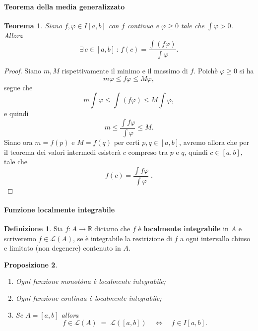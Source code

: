 \documentclass{article}
\theoremstyle{plain}
\newtheorem{thm}{Teorema}[section]
\newtheorem{prop}[thm]{Proposizione}
\theoremstyle{definition}
\newtheorem{defn}{Definizione}[section]
\theoremstyle{remark}
\begin{document}
\paragraph{Teorema della media generalizzato}
\begin{bxthm}
\begin{thm}
    Siano $f,\varphi\in I[a,b]$ con $f$ continua e $\varphi\geq0$ tale che $\int\varphi>0$. 
    Allora 
    \[\exists\,c\in[a,b]\,:\,f(c)=\dfrac{\int (f\varphi)}{\int\varphi}.\]
\end{thm}
\end{bxthm}
\begin{proof}
    Siano $m,M$ rispettivamente il minimo e il massimo di $f$. 
    Poichè $\varphi\geq0$ si ha \[m\varphi\leq f\varphi\leq M\varphi,\] 
    segue che 
    \[m\int\varphi\leq\int(f\varphi)\leq M\int\varphi,\]
    e quindi
    \[m\leq\dfrac{\int f\varphi}{\int\varphi}\leq M.\]
    Siano ora $m=f(p)$ e $M=f(q)$ per certi $p,q\in[a,b]$, avremo allora che 
    per il teorema dei valori intermedi esisterà $c$ compreso tra $p$ e $q$, quindi $c\in[a,b]$,
    tale che \[f(c)=\dfrac{\int f\varphi}{\int\varphi}\;.\]
\end{proof}

\vspace{10pt}

\paragraph{Funzione localmente integrabile}
\begin{bxthm}
\begin{defn}
    Sia $f:A\to\mathbb{R}$ diciamo che $f$ è \textbf{localmente integrabile} in $A$ e scriveremo $f\in\mathcal{L}(A)$,
    se è integrabile la restrizione di $f$ a ogni intervallo chiuso e limitato (non degenere) contenuto in $A$.
\end{defn}
\end{bxthm}

\vspace{10pt}

\begin{bxthm}
\begin{prop}\hfill
    \begin{enumerate}
        \item Ogni funzione monotòna è localmente integrabile;
        \item Ogni funzione continua è localmente integrabile;
        \item Se $A=[a,b]$ allora \[f\in\mathcal{L}(A)\;=\;\mathcal{L}([a,b])\quad\iff\quad f\in I[a,b].\]
    \end{enumerate}
\end{prop}
\end{bxthm}
\end{document}
